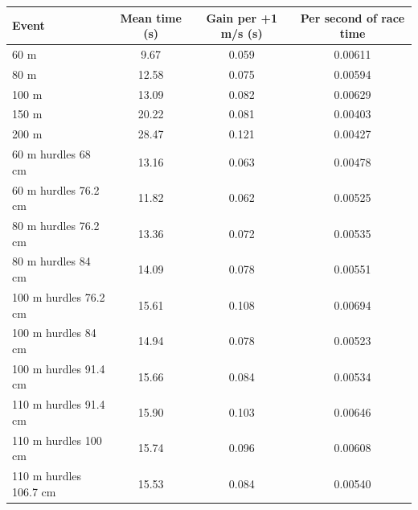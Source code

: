 \begin{tabular}{lccc}
\toprule
Event & Mean time (s) & Gain per +1 m/s (s) & Per second of race time \\
\midrule
60 m & 9.67 & 0.059 & 0.00611 \\
80 m & 12.58 & 0.075 & 0.00594 \\
100 m & 13.09 & 0.082 & 0.00629 \\
150 m & 20.22 & 0.081 & 0.00403 \\
200 m & 28.47 & 0.121 & 0.00427 \\
60 m hurdles 68 cm & 13.16 & 0.063 & 0.00478 \\
60 m hurdles 76.2 cm & 11.82 & 0.062 & 0.00525 \\
80 m hurdles 76.2 cm & 13.36 & 0.072 & 0.00535 \\
80 m hurdles 84 cm & 14.09 & 0.078 & 0.00551 \\
100 m hurdles 76.2 cm & 15.61 & 0.108 & 0.00694 \\
100 m hurdles 84 cm & 14.94 & 0.078 & 0.00523 \\
100 m hurdles 91.4 cm & 15.66 & 0.084 & 0.00534 \\
110 m hurdles 91.4 cm & 15.90 & 0.103 & 0.00646 \\
110 m hurdles 100 cm & 15.74 & 0.096 & 0.00608 \\
110 m hurdles 106.7 cm & 15.53 & 0.084 & 0.00540 \\
\bottomrule
\end{tabular}
